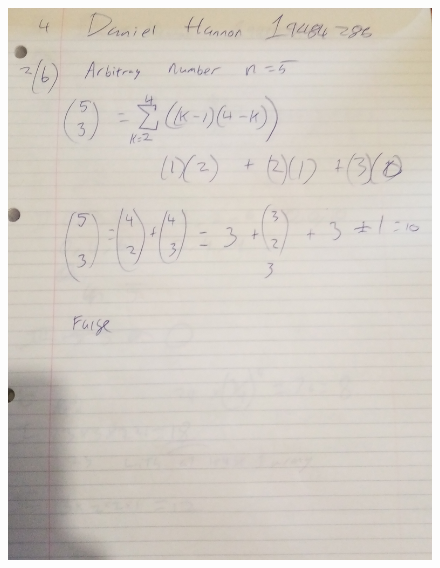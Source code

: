 \documentclass{article}
\begin{document}
	\begin{figure}
		\centering
		\includegraphics[width=\textwidth]{IMG_20210118_111927.jpg}
	\end{figure}
	\newpage
\end{document}
